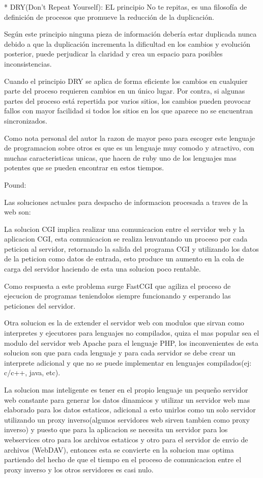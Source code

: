 * DRY(Don't Repeat Yourself): EL principio No te repitas, es una filosofía de definición de procesos que promueve la reducción de la duplicación.

Según este principio ninguna pieza de información debería estar duplicada nunca debido a que la duplicación incrementa la dificultad en los cambios y evolución posterior, puede perjudicar la claridad y crea un espacio para posibles inconsistencias.

Cuando el principio DRY se aplica de forma eficiente los cambios en cualquier parte del proceso requieren cambios en un único lugar. Por contra, si algunas partes del proceso está repertida por varios sitios, los cambios pueden provocar fallos con mayor facilidad si todos los sitios en los que aparece no se encuentran sincronizados.

Como nota personal del autor la razon de mayor peso para escoger este lenguaje de programacion sobre otros es que es un lenguaje muy comodo y atractivo, con muchas caracteristicas unicas, que hacen de ruby uno de los lenguajes mas potentes que se pueden encontrar en estos tiempos.



Pound:

Las soluciones actuales para despacho de informacion procesada a traves de la web son:

La solucion CGI implica realizar una comunicacion entre el servidor web y la aplicacion CGI, esta comunicacion se realiza lenvantando un proceso por cada peticion al servidor, retornando la salida del programa CGI y utilizando los datos de la peticion como datos de entrada, esto produce un aumento en la cola de carga del servidor haciendo de esta una solucion poco rentable.

Como respuesta a este problema surge FastCGI que agiliza el proceso de ejecucion de programas teniendolos siempre funcionando y esperando las peticiones del servidor.

Otra solucion es la de extender el servidor web con modulos que sirvan como interpretes y ejecutores para lenguajes no compilados, quiza el mas popular sea el modulo del servidor web Apache para el lenguaje PHP, los inconvenientes de esta solucion son que para cada lenguaje y para cada servidor se debe crear un interprete adicional y que no se puede implementar en lenguajes compilados(ej: c/c++, java, etc).

La solucion mas inteligente es tener en el propio lenguaje un pequeño servidor web constante para generar los datos dinamicos y utilizar un servidor web mas elaborado para los datos estaticos, adicional a esto unirlos como un solo servidor utilizando un proxy inverso(algunos servidores web sirven tambien como proxy inverso) y puesto que para la aplicacion se necesita un servidor para los webservices otro para los archivos estaticos y otro para el servidor de envio de archivos (WebDAV), entonces esta se convierte en la solucion mas optima partiendo del hecho de que el tiempo en el proceso de comunicacion entre el proxy inverso y los otros servidores es casi nulo.



